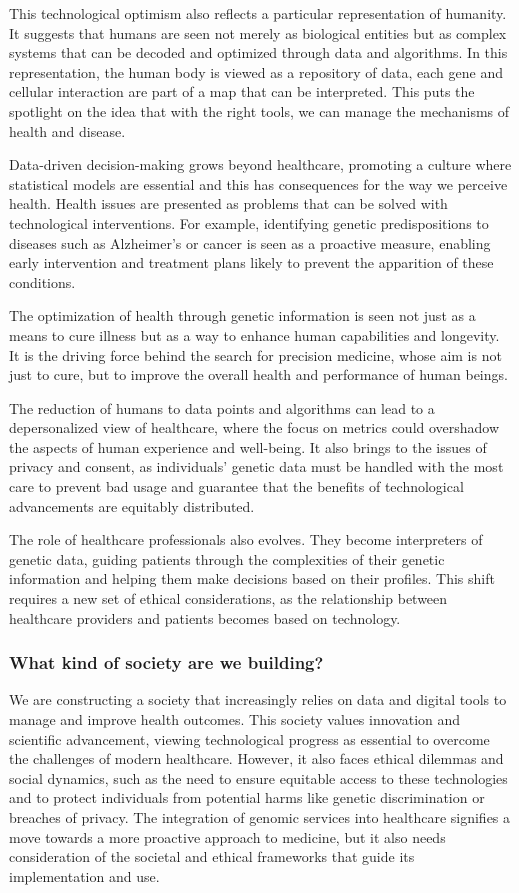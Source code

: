 \documentclass[a4paper]{article}
\begin{document}
This technological optimism also reflects a particular representation of humanity. It suggests that humans are seen not merely as biological entities but as complex systems that can be decoded and optimized through data and algorithms. In this representation, the human body is viewed as a repository of data, each gene and cellular interaction are part of a map that can be interpreted. This puts the spotlight on the idea that with the right tools, we can manage the mechanisms of health and disease.

Data-driven decision-making grows beyond healthcare, promoting a culture where statistical models are essential and this has consequences for the way we perceive health. Health issues are presented as problems that can be solved with technological interventions. For example, identifying genetic predispositions to diseases such as Alzheimer's or cancer is seen as a proactive measure, enabling early intervention and treatment plans likely to prevent the apparition of these conditions.

The optimization of health through genetic information is seen not just as a means to cure illness but as a way to enhance human capabilities and longevity. It is the driving force behind the search for precision medicine, whose aim is not just to cure, but to improve the overall health and performance of human beings.

The reduction of humans to data points and algorithms can lead to a depersonalized view of healthcare, where the focus on metrics could overshadow the aspects of human experience and well-being. It also brings to the issues of privacy and consent, as individuals' genetic data must be handled with the most care to prevent bad usage and guarantee that the benefits of technological advancements are equitably distributed.

The role of healthcare professionals also evolves. They become interpreters of genetic data, guiding patients through the complexities of their genetic information and helping them make decisions based on their profiles. This shift requires a new set of ethical considerations, as the relationship between healthcare providers and patients becomes based on technology.

\subsubsection{What kind of society are we building?}

We are constructing a society that increasingly relies on data and digital tools to manage and improve health outcomes. This society values innovation and scientific advancement, viewing technological progress as essential to overcome the challenges of modern healthcare. However, it also faces ethical dilemmas and social dynamics, such as the need to ensure equitable access to these technologies and to protect individuals from potential harms like genetic discrimination or breaches of privacy. The integration of genomic services into healthcare signifies a move towards a more proactive approach to medicine, but it also needs consideration of the societal and ethical frameworks that guide its implementation and use.
\end{document}

